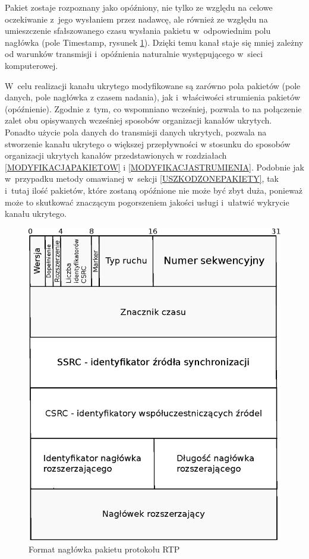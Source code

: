 \documentclass[a4paper, twoside, openright, 12pt]{report}
\begin{document}
        Pakiet zostaje rozpoznany jako opóźniony, nie tylko ze względu na celowe
        oczekiwanie z~jego wysłaniem przez nadawcę, ale również ze względu
        na umieszczenie sfałszowanego czasu wysłania pakietu w~odpowiednim
        polu nagłówka (pole Timestamp, rysunek \ref{RTPHEADER}). Dzięki temu kanał staje się mniej zależny
        od warunków transmisji i~opóźnienia naturalnie występującego w~sieci komputerowej.

        W~celu realizacji kanału ukrytego modyfikowane są zarówno pola pakietów (pole danych,
        pole nagłówka z czasem nadania), jak i~właściwości strumienia pakietów (opóźnienie).
        Zgodnie z~tym, co wspomniano wcześniej, pozwala to na połączenie zalet obu opisywanych
        wcześniej sposobów organizacji kanałów ukrytych. Ponadto użycie pola danych
        do transmisji danych ukrytych, pozwala na stworzenie kanału ukrytego o
        większej przepływności w stosunku do sposobów organizacji ukrytych kanałów
        przedstawionych w rozdziałach \ref{MODYFIKACJAPAKIETOW} i \ref{MODYFIKACJASTRUMIENIA}.
        Podobnie jak w~przypadku metody omawianej w~sekcji
        \ref{USZKODZONEPAKIETY}, tak i~tutaj ilość pakietów, które zostaną opóźnione
        nie może być zbyt duża, ponieważ może to skutkować znaczącym pogorszeniem
        jakości usługi i~ułatwić wykrycie kanału ukrytego.

        \begin{figure}[h]
                \centering
                \includegraphics[scale=0.8]{rtp_header}
                \caption{Format nagłówka pakietu protokołu RTP}
                \label{RTPHEADER}
        \end{figure}
\end{document}
